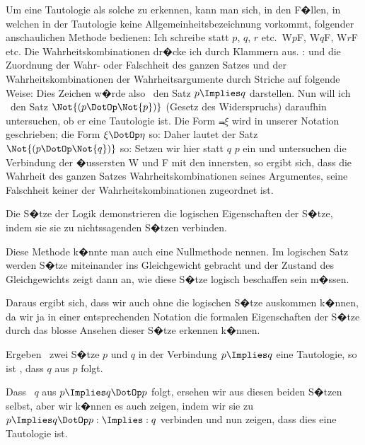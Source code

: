 \begin{propositions}
{{\verystretchyspace
Um eine Tautologie als solche zu erkennen,
kann man sich, in den F�llen, in welchen in der
Tautologie keine Allgemeinheitsbezeichnung vorkommt,
folgender anschaulichen Methode bedienen:
Ich schreibe statt \glqq{}$p$\grqq{}, \glqq{}$q$\grqq{}, \glqq{}$r$\grqq{} etc.\ \glqq{}W$p$F\grqq{},
\glqq{}W$q$F\grqq{}, \glqq{}W$r$F\grqq{} etc. Die Wahrheitskombinationen
dr�cke ich durch Klammern aus.
\zumBeispiel:}
und die Zuordnung der Wahr- oder Falschheit des
ganzen Satzes und der Wahrheitskombinationen
der Wahrheitsargumente durch Striche auf
folgende Weise:
Dies Zeichen w�rde also \zumBeispiel\ den Satz $p \Implies q$
darstellen. Nun will ich \zumBeispiel\ den Satz $\Not{(p \DotOp \Not{p})}$
(Gesetz des Widerspruchs) daraufhin untersuchen,
ob er eine Tautologie ist. Die Form \glqq{}$\Not{\xi}$\grqq{} wird
in unserer Notation
geschrieben; die Form \glqq{}$\xi \DotOp \eta$\grqq{} so:
Daher lautet der Satz $\Not{(p \DotOp \Not{q})}$ so:
Setzen wir hier statt \glqq{}$q$\grqq{} \glqq{}$p$\grqq{} ein und untersuchen
die Verbindung der �ussersten W und F mit den
innersten, so ergibt sich, dass die Wahrheit des
ganzen Satzes  Wahrheitskombinationen
seines Argumentes, seine Falschheit keiner der
Wahrheitskombinationen zugeordnet ist.}


{Die S�tze der Logik demonstrieren die logischen
Eigenschaften der S�tze, indem sie sie zu nichtssagenden
S�tzen verbinden.

Diese Methode k�nnte man auch eine Nullmethode
nennen. Im logischen Satz werden S�tze
miteinander ins Gleichgewicht gebracht und der
Zustand des Gleichgewichts zeigt dann an, wie
diese S�tze logisch beschaffen sein m�ssen.}


{Daraus ergibt sich, dass wir auch ohne die
logischen S�tze auskommen k�nnen, da wir ja in
einer entsprechenden Notation die formalen Eigenschaften
der S�tze durch das blosse Ansehen dieser
S�tze erkennen k�nnen.}


{Ergeben \zumBeispiel\ zwei S�tze \glqq{}$p$\grqq{} und \glqq{}$q$\grqq{} in der
Verbindung \glqq{}$p \Implies q$\grqq{} eine Tautologie, so ist ,
dass $q$ aus $p$ folgt.

Dass \zumBeispiel\ \glqq{}$q$\grqq{} aus \glqq{}$p \Implies q \DotOp p$\grqq{} folgt, ersehen wir
aus diesen beiden S�tzen selbst, aber wir k�nnen
es auch  zeigen, indem wir sie zu \glqq{}$p \Implies q \DotOp p : \Implies : q$\grqq{}
verbinden und nun zeigen, dass dies eine Tautologie
ist.}



\end{propositions}
